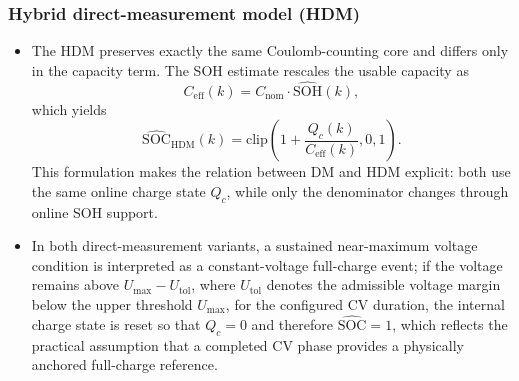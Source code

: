 \documentclass[review]{elsarticle}
\begin{document}
\subsubsection{Hybrid direct-measurement model (HDM)}
\begin{itemize}[leftmargin=*]
    \item The HDM preserves exactly the same Coulomb-counting core and differs only in the capacity term. The SOH estimate rescales the usable capacity as
    \begin{equation}
        C_{\mathrm{eff}}(k)=C_{\mathrm{nom}} \cdot \widehat{\mathrm{SOH}}(k),
        \label{eq:ceff}
    \end{equation}
    which yields
    \begin{equation}
        \widehat{\mathrm{SOC}}_{\mathrm{HDM}}(k)=\mathrm{clip}\!\left(1+\frac{Q_c(k)}{C_{\mathrm{eff}}(k)},0,1\right).
        \label{eq:soc_hdm}
    \end{equation}
    This formulation makes the relation between DM and HDM explicit: both use the same online charge state $Q_c$, while only the denominator changes through online SOH support.
    \item In both direct-measurement variants, a sustained near-maximum voltage condition is interpreted as a constant-voltage full-charge event; if the voltage remains above $U_{\max}-U_{\mathrm{tol}}$, where $U_{\mathrm{tol}}$ denotes the admissible voltage margin below the upper threshold $U_{\max}$, for the configured CV duration, the internal charge state is reset so that $Q_c=0$ and therefore $\widehat{\mathrm{SOC}}=1$, which reflects the practical assumption that a completed CV phase provides a physically anchored full-charge reference.
\end{itemize}
\end{document}
